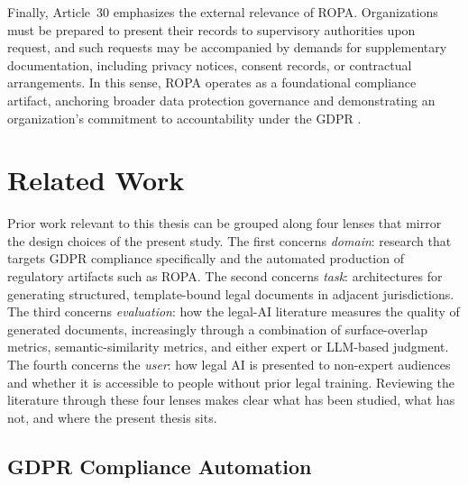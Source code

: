 Finally, Article~30 emphasizes the external relevance of ROPA. Organizations must be prepared to present their records to supervisory authorities upon request, and such requests may be accompanied by demands for supplementary documentation, including privacy notices, consent records, or contractual arrangements. In this sense, ROPA operates as a foundational compliance artifact, anchoring broader data protection governance and demonstrating an organization's commitment to accountability under the GDPR \cite{gdpr-info-art30, osano-ropa}.



\section{Related Work}

Prior work relevant to this thesis can be grouped along four lenses that mirror the design choices of the present study. The first concerns \emph{domain}: research that targets GDPR compliance specifically and the automated production of regulatory artifacts such as ROPA. The second concerns \emph{task}: architectures for generating structured, template-bound legal documents in adjacent jurisdictions. The third concerns \emph{evaluation}: how the legal-AI literature measures the quality of generated documents, increasingly through a combination of surface-overlap metrics, semantic-similarity metrics, and either expert or LLM-based judgment. The fourth concerns the \emph{user}: how legal AI is presented to non-expert audiences and whether it is accessible to people without prior legal training. Reviewing the literature through these four lenses makes clear what has been studied, what has not, and where the present thesis sits.

\subsection{GDPR Compliance Automation}

